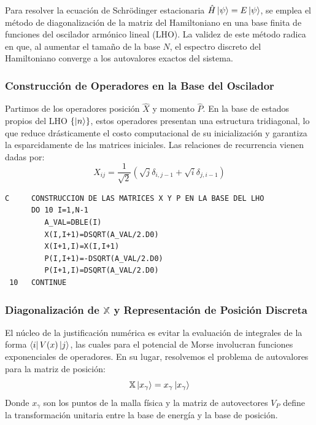 \documentclass[11pt,fleqn]{article}
\begin{document}
Para resolver la ecuación de Schrödinger estacionaria $\hat{H} \ket{\psi} = E \ket{\psi}$, se emplea el método de diagonalización de la matriz del Hamiltoniano en una base finita de funciones del oscilador armónico lineal (LHO). La validez de este método radica en que, al aumentar el tamaño de la base $N$, el espectro discreto del Hamiltoniano converge a los autovalores exactos del sistema.

\subsubsection{Construcción de Operadores en la Base del Oscilador}

Partimos de los operadores posición $\hat{X}$ y momento $\hat{P}$. En la base de estados propios del LHO $\{\ket{n}\}$, estos operadores presentan una estructura tridiagonal, lo que reduce drásticamente el costo computacional de su inicialización y garantiza la esparcidamente de las matrices iniciales. Las relaciones de recurrencia vienen dadas por:
\begin{equation}
    X_{ij} = \frac{1}{\sqrt{2}}(\sqrt{j}\delta_{i,j-1} + \sqrt{i}\delta_{j,i-1})
\end{equation}

\begin{lstlisting}[caption=Inicialización de operadores de primer orden en Fortran 77]
C     CONSTRUCCION DE LAS MATRICES X Y P EN LA BASE DEL LHO
      DO 10 I=1,N-1
         A_VAL=DBLE(I)
         X(I,I+1)=DSQRT(A_VAL/2.D0)
         X(I+1,I)=X(I,I+1)
         P(I,I+1)=-DSQRT(A_VAL/2.D0)
         P(I+1,I)=DSQRT(A_VAL/2.D0)
 10   CONTINUE
\end{lstlisting}

\subsubsection{Diagonalización de $\mathbb{X}$ y Representación de Posición Discreta}

El núcleo de la justificación numérica es evitar la evaluación de integrales de la forma $\bra{i} V(x) \ket{j}$, las cuales para el potencial de Morse involucran funciones exponenciales de operadores. En su lugar, resolvemos el problema de autovalores para la matriz de posición:
\begin{equation}
    \mathbb{X} \ket{x_\gamma} = x_\gamma \ket{x_\gamma}
\end{equation}
Donde $x_\gamma$ son los puntos de la malla física y la matriz de autovectores $V_{P}$ define la transformación unitaria entre la base de energía y la base de posición.
\end{document}
